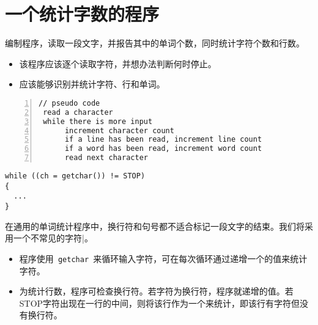 \section{一个统计字数的程序}

\begin{frame}[fragile]\ft{\secname}
编制程序，读取一段文字，并报告其中的单词个数，同时统计字符个数和行数。
\end{frame}


\begin{frame}[fragile]\ft{\secname}
\begin{itemize}
\item 该程序应该逐个读取字符，并想办法判断何时停止。\\[0.2in]
\item 应该能够识别并统计字符、行和单词。
\end{itemize}
\end{frame}

\begin{frame}[fragile]\ft{\secname}
\begin{lstlisting}[numbers=left]
// pseudo code
 read a character
 while there is more input
      increment character count
      if a line has been read, increment line count
      if a word has been read, increment word count
      read next character
\end{lstlisting}
\end{frame}

\begin{frame}[fragile]\ft{\secname}
\begin{lstlisting}[title=循环输入结构]
while ((ch = getchar()) != STOP)
{
  ...
}
\end{lstlisting}

\vspace{.1in}\pause 

在通用的单词统计程序中，换行符和句号都不适合标记一段文字的结束。我们将采用一个不常见的字符|。
\end{frame}

\begin{frame}[fragile]\ft{\secname}
\begin{itemize}
\item 程序使用\lstinline| getchar |来循环输入字符，可在每次循环通过递增一个的值来统计字符。\\[0.15in]
\item 为统计行数，程序可检查换行符。若字符为换行符，程序就递增的值。若STOP字符出现在一行的中间，则将该行作为一个来统计，即该行有字符但没有换行符。
\end{itemize}
\end{frame}

